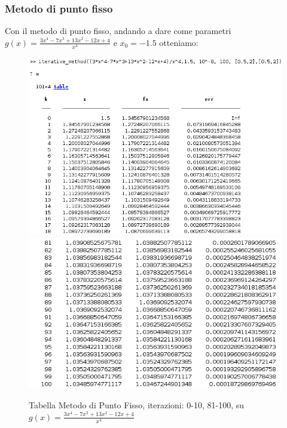 \documentclass[12pt, letterpaper]{article}
\begin{document}
\newpage

\subsubsection{Metodo di punto fisso}
Con il metodo di punto fisso, andando a dare come parametri $g(x)=\frac{3x^4-7x^3+13x^2-12x+4}{x^4}$ e $x_0=-1.5$ otteniamo:
\begin{figure}[ht!]
    \includegraphics[scale=0.51]{TabellaMultiRadixPuntoFisso1.png}\\
    \includegraphics[scale=0.51]{TabellaMultiRadixPuntoFisso2.png}
    \caption{Tabella Metodo di Punto Fisso, iterazioni: 0-10, 81-100, su $g(x)=\frac{3x^4-7x^3+13x^2-12x+4}{x^4}$}
\end{figure}
\end{document}
